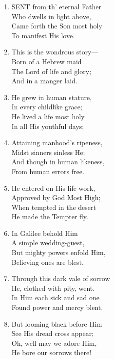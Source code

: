 \documentclass[11pt,a4paper]{article}
\begin{document}
\begin{enumerate}
    \item SENT from th' eternal Father \\
        Who dwells in light above, \\
        Came forth the Son most holy \\
        To manifest His love.

    \item This is the wondrous story--- \\
        Born of a Hebrew maid \\
        The Lord of life and glory; \\
        And in a manger laid.

    \item He grew in human stature, \\
        In every childlike grace; \\
        He lived a life most holy \\
        In all His youthful days;

    \item Attaining manhood's ripeness, \\
        Midst sinners sinless He; \\
        And though in human likeness, \\
        From human errors free.

    \item He entered on His life-work, \\
        Approved by God Most High; \\
        When tempted in the desert \\
        He made the Tempter fly.

    \item In Galilee behold Him \\
        A simple wedding-guest, \\
        But mighty powers enfold Him, \\
        Believing ones are blest.

    \item Through this dark vale of sorrow \\
        He, clothed with pity, went. \\
        In Him each sick and sad one \\
        Found power and mercy blent.

    \item But looming black before Him \\
        See His dread cross appear; \\
        Oh, well may we adore Him, \\
        He bore our sorrows there!


\end{enumerate}
\end{document}
